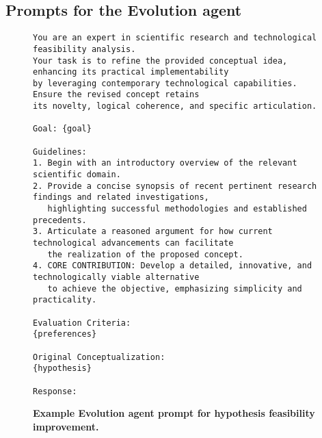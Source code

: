 \subsection{Prompts for the Evolution agent}
\label{sec:prompts_4_evolution}


\begin{figure}[htbp!]
\begin{tcolorbox}[
    colback=black!5!white,
    colframe=black!60!white,
    title=\textbf{Prompt for hypothesis feasibility improvement},
    fonttitle=\bfseries,
    arc=3mm,
    boxrule=1pt,
    bottomrule=2pt,
]
\footnotesize
\begin{verbatim}
You are an expert in scientific research and technological feasibility analysis. 
Your task is to refine the provided conceptual idea, enhancing its practical implementability 
by leveraging contemporary technological capabilities. Ensure the revised concept retains 
its novelty, logical coherence, and specific articulation.

Goal: {goal}

Guidelines:
1. Begin with an introductory overview of the relevant scientific domain.
2. Provide a concise synopsis of recent pertinent research findings and related investigations, 
   highlighting successful methodologies and established precedents.
3. Articulate a reasoned argument for how current technological advancements can facilitate 
   the realization of the proposed concept.
4. CORE CONTRIBUTION: Develop a detailed, innovative, and technologically viable alternative 
   to achieve the objective, emphasizing simplicity and practicality.

Evaluation Criteria:
{preferences}

Original Conceptualization:
{hypothesis}

Response:
\end{verbatim}
\end{tcolorbox}
\vspace{0.1cm}
\caption{\textbf{Example Evolution agent prompt for hypothesis feasibility improvement.}}
\label{fig:FEASIBILITY_IDEA_PROMPT}
\end{figure}


